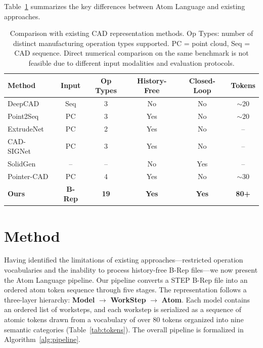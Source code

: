 \documentclass{styles/svproc}
\begin{document}
Table~\ref{tab:comparison} summarizes the key differences between Atom Language and existing approaches.

\begin{table}[t]
\caption{Comparison with existing CAD representation methods. Op Types: number of distinct manufacturing operation types supported. PC = point cloud, Seq = CAD sequence. Direct numerical comparison on the same benchmark is not feasible due to different input modalities and evaluation protocols.}
\label{tab:comparison}
\centering
\small
\begin{tabular}{lccccc}
\toprule
Method & Input & Op Types & History-Free & Closed-Loop & Tokens \\
\midrule
DeepCAD~\cite{wu2021deepcad} & Seq & 3 & No & No & $\sim$20 \\
Point2Seq~\cite{you2022point2sequence} & PC & 3 & Yes & No & $\sim$20 \\
ExtrudeNet~\cite{ren2022extrudenet} & PC & 2 & Yes & No & -- \\
CAD-SIGNet~\cite{xiao2022cadsignet} & PC & 3 & Yes & No & -- \\
SolidGen~\cite{jayaraman2022solidgen} & -- & -- & No & Yes & -- \\
Pointer-CAD~\cite{gong2025pointer} & PC & 4 & Yes & No & $\sim$30 \\
\textbf{Ours} & \textbf{B-Rep} & \textbf{19} & \textbf{Yes} & \textbf{Yes} & \textbf{80+} \\
\bottomrule
\end{tabular}
\vspace{-2mm}
\end{table}

\section{Method}
\label{sec:method}
Having identified the limitations of existing approaches---restricted operation vocabularies and the inability to process history-free B-Rep files---we now present the Atom Language pipeline. Our pipeline converts a STEP B-Rep file into an ordered atom token sequence through five stages. The representation follows a three-layer hierarchy: \textbf{Model} $\to$ \textbf{WorkStep} $\to$ \textbf{Atom}. Each model contains an ordered list of worksteps, and each workstep is serialized as a sequence of atomic tokens drawn from a vocabulary of over 80 tokens organized into nine semantic categories (Table~\ref{tab:tokens}). The overall pipeline is formalized in Algorithm~\ref{alg:pipeline}.
\end{document}
